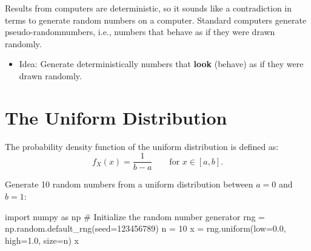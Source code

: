 \documentclass[
  letterpaper,
  DIV=11,
  numbers=noendperiod]{scrreprt}
\newenvironment{Shaded}{\begin{snugshade}}{\end{snugshade}}
\newcommand{\CommentTok}[1]{\textcolor[rgb]{0.37,0.37,0.37}{#1}}
\newcommand{\DecValTok}[1]{\textcolor[rgb]{0.68,0.00,0.00}{#1}}
\newcommand{\FloatTok}[1]{\textcolor[rgb]{0.68,0.00,0.00}{#1}}
\newcommand{\ImportTok}[1]{\textcolor[rgb]{0.00,0.46,0.62}{#1}}
\newcommand{\NormalTok}[1]{\textcolor[rgb]{0.00,0.23,0.31}{#1}}
\newcommand{\OperatorTok}[1]{\textcolor[rgb]{0.37,0.37,0.37}{#1}}
\providecommand{\tightlist}{%
  \setlength{\itemsep}{0pt}\setlength{\parskip}{0pt}}\usepackage{longtable,booktabs,array}
\begin{document}
Results from computers are deterministic, so it sounds like a
contradiction in terms to generate random numbers on a computer.
Standard computers generate pseudo-randomnumbers, i.e., numbers that
behave as if they were drawn randomly.

\begin{tcolorbox}[enhanced jigsaw, arc=.35mm, colback=white, bottomtitle=1mm, toprule=.15mm, coltitle=black, titlerule=0mm, leftrule=.75mm, title=\textcolor{quarto-callout-note-color}{\faInfo}\hspace{0.5em}{Deterministic Random Numbers}, opacitybacktitle=0.6, breakable, colbacktitle=quarto-callout-note-color!10!white, opacityback=0, toptitle=1mm, rightrule=.15mm, left=2mm, colframe=quarto-callout-note-color-frame, bottomrule=.15mm]

\begin{itemize}
\tightlist
\item
  Idea: Generate deterministically numbers that \textbf{look} (behave)
  as if they were drawn randomly.
\end{itemize}

\end{tcolorbox}

\hypertarget{the-uniform-distribution}{%
\section{The Uniform Distribution}\label{the-uniform-distribution}}

The probability density function of the uniform distribution is defined
as: \[
f_X(x) = \frac{1}{b-a} \qquad \text{for $x \in [a,b]$}.
\]

Generate 10 random numbers from a uniform distribution between \(a=0\)
and \(b=1\):

\begin{Shaded}
\begin{Highlighting}[]
\ImportTok{import}\NormalTok{ numpy }\ImportTok{as}\NormalTok{ np}
\CommentTok{\# Initialize the random number generator}
\NormalTok{rng }\OperatorTok{=}\NormalTok{ np.random.default\_rng(seed}\OperatorTok{=}\DecValTok{123456789}\NormalTok{)}
\NormalTok{n }\OperatorTok{=} \DecValTok{10}
\NormalTok{x }\OperatorTok{=}\NormalTok{ rng.uniform(low}\OperatorTok{=}\FloatTok{0.0}\NormalTok{, high}\OperatorTok{=}\FloatTok{1.0}\NormalTok{, size}\OperatorTok{=}\NormalTok{n)}
\NormalTok{x}
\end{Highlighting}
\end{Shaded}
\end{document}
